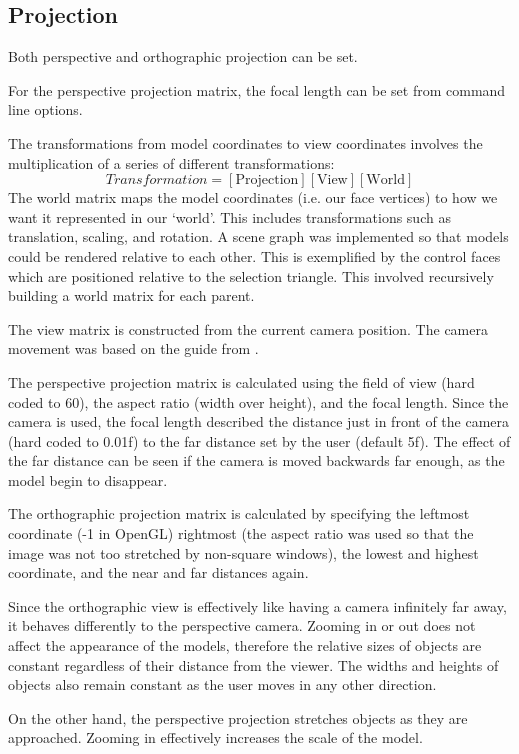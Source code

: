 \documentclass[12pt]{article}
\begin{document}
\subsection{Projection}

Both perspective and orthographic projection can be set.

For the perspective projection matrix, the focal length can be set from command line options. 

The transformations from model coordinates to view coordinates involves the multiplication of a series of different transformations:
$$
Transformation = [\textrm{Projection}][\textrm{View}][\textrm{World}]
$$
The world matrix maps the model coordinates (i.e. our face vertices) to how we want it represented in our `world'. 
This includes transformations such as translation, scaling, and rotation.
A scene graph was implemented so that models could be rendered relative to each other.
This is exemplified by the control faces which are positioned relative to the selection triangle.
This involved recursively building a world matrix for each parent.

The view matrix is constructed from the current camera position. 
The camera movement was based on the guide from \cite{lwjglgamedev}.

The perspective projection matrix is calculated using the field of view (hard coded to 60), the aspect ratio (width over height), and the focal length.
Since the camera is used, the focal length described the distance just in front of the camera (hard coded to 0.01f) to the far distance set by the user (default 5f).
The effect of the far distance can be seen if the camera is moved backwards far enough, as the model begin to disappear.

The orthographic projection matrix is calculated by specifying the leftmost coordinate (-1 in OpenGL) rightmost (the aspect ratio was used so that the image was not too stretched by non-square windows), the lowest and highest coordinate, and the near and far distances again.

Since the orthographic view is effectively like having a camera infinitely far away, it behaves differently to the perspective camera.
Zooming in or out does not affect the appearance of the models, therefore the relative sizes of objects are constant regardless of their distance from the viewer.
The widths and heights of objects also remain constant as the user moves in any other direction.

On the other hand, the perspective projection stretches objects as they are approached. 
Zooming in effectively increases the scale of the model.
\end{document}
